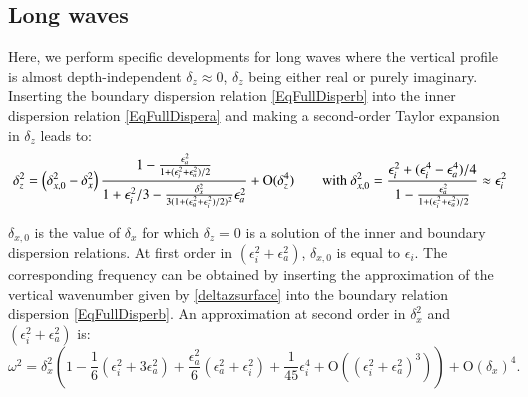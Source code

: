 \subsection{Long waves}
\label{SubSectionLongWavesrealdz}
Here, we perform specific developments for long waves where the vertical profile is almost depth-independent $\delta_z \approx 0$, $\delta_z$ being either real or purely imaginary.
Inserting the boundary dispersion relation \ref{EqFullDisperb} into the inner dispersion relation \ref{EqFullDispera} and making a second-order Taylor expansion in $\delta_z$ leads to:
\begin{equation}
	\delta_z^2=\left(
	\delta_{x,0}^2-\delta_x^2
	\right)
	\frac{1-\frac{\epsilon_a^2}{1+(\epsilon_i^2+\epsilon_a^2)/2}}{1+\epsilon_i^2/3-\frac{\delta_x^2}{3(1+(\epsilon_a^2+\epsilon_i^2)/2)^2}\epsilon_a^2}+\mathrm{O}(\delta_z^4)
\qquad\hbox{with }
\delta_{x,0}^2
=
\frac{\epsilon_i^2+(\epsilon_i^4-\epsilon_a^4)/4}{1-\frac{\epsilon_a^2}{1+(\epsilon_i^2+\epsilon_a^2)/2}}
\approx \epsilon_i^2
	\label{deltazsurface}
\end{equation}

%
$\delta_{x,0}$ is the value of $\delta_x$ for which $\delta_z=0$ is a solution of the inner and boundary dispersion relations. At first order in $(\epsilon_i^2+\epsilon_a^2)$, $\delta_{x,0}$ is equal to $\epsilon_i$.
The corresponding frequency can be obtained by inserting the approximation of the vertical wavenumber given by \ref{deltazsurface} into the boundary relation dispersion \ref{EqFullDisperb}. An approximation at second order in $\delta_x^2$ and $(\epsilon_i^2+\epsilon_a^2)$ is:
\begin{equation}
	\omega^2 = \delta_x^2 \left(
	1
	-\frac{1}{6}\left(
	\epsilon_i^2+3\epsilon_a^2
	\right)
	+\frac{\epsilon_a^2}{6}\left(\epsilon_a^2+\epsilon_i^2\right)+\frac{1}{45}\epsilon_i^4
	+\mathrm{O}((\epsilon_i^2+\epsilon_a^2)^3)
	\right)
	+\mathrm{O}(\delta_x)^4.
	\label{eqomegalongwavereal}
\end{equation}
%
